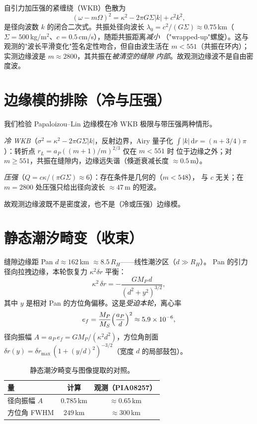 \documentclass[11pt]{ctexart}
\theoremstyle{remark}
\newcommand{\dd}{\,\mathrm{d}}
\begin{document}
自引力加压强的紧缠绕（WKB）色散为
\begin{equation}\label{eq:dispersion}
(\omega-m\Omega)^2=\kappa^2-2\pi G\Sigma|k|+c^2k^2,
\end{equation}
是径向波数 $k$ 的闭合二次式。共振处径向波长 $\lambda_0=c^2/(G\Sigma)\approx
0.75$\,km（$\Sigma=500$\,kg/m$^2$、$c=0.5$\,cm/s），随距共振距离\emph{减小}
（"wrapped-up"螺旋）。这与观测的"波长平滑变化"签名定性吻合，但自由波生活在
$m<551$（共振在环内）；实测边缘波是 $m\approx2800$，其共振在\emph{被清空的缝隙
内部}。故观测边缘波不是自由密度波。

\section{边缘模的排除（冷与压强）}\label{sec:edgemode}

我们检验 Papaloizou--Lin 边缘模在冷 WKB 极限与带压强两种情形。

\emph{冷 WKB}（$\sigma^2=\kappa^2-2\pi G\Sigma|k|$，反射边界，Airy 量子化
$\int|k|\dd r=(n+3/4)\pi$）：转折点 $r_L=a_P((m+1)/m)^{2/3}$ 仅在 $m<551$ 时
位于边缘之外；对 $m\ge551$，共振在缝隙内，边缘远失谐（倏逝衰减长度
$\approx0.5$\,m）。

\emph{压强}（$Q=c\kappa/(\pi G\Sigma)\approx6$）：存在条件是几何的（$m<548$），
与 $c$ 无关；在 $m=2800$ 处压强只给出径向波长 $\approx47$\,m 的短波。

故观测边缘波既不是密度波，也不是（冷或压强）边缘模。

\section{静态潮汐畸变（收束）}\label{sec:tidal}

缝隙边缘距 Pan $d\approx162$\,km $\approx8.5\,R_H$——线性潮汐区（$d\gg R_H$）。
Pan 的引力径向拉拽边缘，本轮恢复力 $\kappa^2\delta r$ 平衡：
\begin{equation}\label{eq:tidal}
\kappa^2\,\delta r=-\frac{GM_P\,d}{(d^2+y^2)^{3/2}},
\end{equation}
其中 $y$ 是相对 Pan 的方位角偏移。这是\emph{受迫本轮}，离心率
\begin{equation}\label{eq:ecc}
e_f=\frac{M_P}{M_S}\Bigl(\frac{a_P}{d}\Bigr)^2\approx5.9\times10^{-6},
\end{equation}
径向振幅 $A=a_P\,e_f=GM_P/(\kappa^2 d^2)$，方位角剖面
$\delta r(y)=\delta r_{\max}\,(1+(y/d)^2)^{-3/2}$（宽度 $d$ 的局部鼓包）。

\begin{table}[ht]
\centering
\begin{tabular}{l c c}
\toprule
量 & 计算 & 观测（PIA08257）\\
\midrule
径向振幅 $A$ & $0.785$\,km & $\approx0.65$\,km\\
方位角 FWHM & $249$\,km & $\approx300$\,km\\
\bottomrule
\end{tabular}
\caption{静态潮汐畸变与图像提取的对照。}
\label{tab:tidal}
\end{table}
\end{document}
